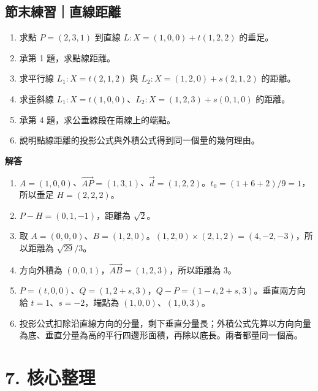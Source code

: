 \documentclass[11pt,a4paper]{article}
\providecommand{\tightlist}{%
  \setlength{\itemsep}{0pt}\setlength{\parskip}{0pt}}
\begin{document}
\begin{HandoutSelfCheck}

\subsection{節末練習｜直線距離}\label{ux7bc0ux672bux7df4ux7fd2ux76f4ux7ddaux8dddux96e2}

\begin{enumerate}
\def\labelenumi{\arabic{enumi}.}
\tightlist
\item
  求點 \(P=(2,3,1)\) 到直線 \(L:X=(1,0,0)+t(1,2,2)\) 的垂足。
\item
  承第 1 題，求點線距離。
\item
  求平行線 \(L_1:X=t(2,1,2)\) 與 \(L_2:X=(1,2,0)+s(2,1,2)\) 的距離。
\item
  求歪斜線 \(L_1:X=t(1,0,0)\)、\(L_2:X=(1,2,3)+s(0,1,0)\) 的距離。
\item
  承第 4 題，求公垂線段在兩線上的端點。
\item
  說明點線距離的投影公式與外積公式得到同一個量的幾何理由。
\end{enumerate}

\textbf{解答}

\begin{enumerate}
\def\labelenumi{\arabic{enumi}.}
\tightlist
\item
  \(A=(1,0,0)\)、\(\overrightarrow{AP}=(1,3,1)\)、\(\vec d=(1,2,2)\)。\(t_0=(1+6+2)/9=1\)，所以垂足 \(H=(2,2,2)\)。
\item
  \(P-H=(0,1,-1)\)，距離為 \(\boxed{\sqrt2}\)。
\item
  取 \(A=(0,0,0)\)、\(B=(1,2,0)\)。\((1,2,0)\times(2,1,2)=(4,-2,-3)\)，所以距離為 \(\boxed{\sqrt{29}/3}\)。
\item
  方向外積為 \((0,0,1)\)，\(\overrightarrow{AB}=(1,2,3)\)，所以距離為 \(\boxed3\)。
\item
  \(P=(t,0,0)\)、\(Q=(1,2+s,3)\)，\(Q-P=(1-t,2+s,3)\)。垂直兩方向給 \(t=1\)、\(s=-2\)，端點為 \((1,0,0)\)、\((1,0,3)\)。
\item
  投影公式扣除沿直線方向的分量，剩下垂直分量長；外積公式先算以方向向量為底、垂直分量為高的平行四邊形面積，再除以底長。兩者都量同一個高。
\end{enumerate}

\end{HandoutSelfCheck}

\section{7. 核心整理}\label{ux6838ux5fc3ux6574ux7406}
\end{document}
